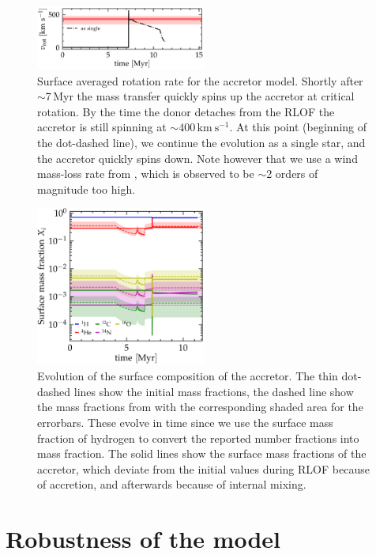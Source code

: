 \documentclass[twocolumn,twocolappendix,trackchanges]{aastex63}
\newcommand{\kms}{{\mathrm{km\ s^{-1}}}}
\begin{document}
\begin{figure}[htbp]
  \includegraphics[width=0.5\textwidth]{zeta_rot}
  \caption{Surface averaged rotation rate for the accretor
    model. Shortly after $\sim$7\,Myr the mass transfer quickly spins
    up the accretor at critical rotation. By the time the donor
    detaches from the RLOF the accretor is still spinning at
    $\sim$$400\,\kms$. At this point (beginning of the dot-dashed line), we continue the evolution as a single star, and the accretor quickly spins down. Note however that we use a wind mass-loss rate from \cite{vink:01}, which is observed to be
    $\sim$2 orders of magnitude too high.}
  \label{fig:rot}
\end{figure}


\begin{figure}[htbp]
  \includegraphics[width=0.5\textwidth]{composition_zeta}
  \caption{Evolution of the surface composition of the accretor. The
    thin dot-dashed lines show the initial mass fractions, the dashed
    line show the mass fractions from \cite{villamariz:05} with the
    corresponding shaded area for the errorbars. These evolve in time
    since we use the surface mass fraction of hydrogen to convert the
    reported number fractions into mass fraction. The solid lines show
    the surface mass fractions of the accretor, which deviate from the
    initial values during RLOF because of accretion, and afterwards
    because of internal mixing. }
  \label{fig:surface_ab}
\end{figure}

\section{Robustness of the model}
\label{sec:param_variations}
\end{document}
